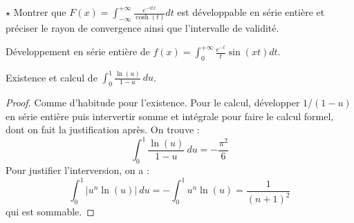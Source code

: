 \documentclass[french,a4paper]{article}
\theoremstyle{plain}
\theoremstyle{definition}
\theoremstyle{remark}
\begin{document}
\begin{ex}[Moulin.SE.39]{$\star$}
	Montrer que $F(x)=\displaystyle\int_{-\infty}^{+\infty}\frac{e^{-itx}}{\cosh(t)}dt$ est développable en série entière et préciser le rayon de convergence ainsi que l'intervalle de validité.
\end{ex}

\begin{ex}[Moulin.SE.40]{}
	Développement en série entière de $f(x)=\displaystyle\int_{0}^{+\infty}\frac{e^{-t}}{t}\sin(xt)dt$.
\end{ex}

\begin{ex}[Moulin.SE.41]{}
	Existence et calcul de $\displaystyle\int_{0}^{1}\frac{\ln(u)}{1-u}\ du$.
\end{ex}
\begin{proof}
	Comme d'habitude pour l'existence. Pour le calcul, développer $1/(1-u)$ en série entière puis intervertir somme et intégrale pour faire le calcul formel, dont on fait la justification après. On trouve : $$\int_{0}^{1}\frac{\ln(u)}{1-u}\ du=-\frac{\pi^2}{6}$$ Pour justifier l'interversion, on a : $$\int_{0}^{1}\lvert u^n\ln(u)\rvert\ du=-\int_{0}^{1}u^n\ln(u)=\frac{1}{(n+1)^2}$$ qui est sommable.
\end{proof}
\end{document}
